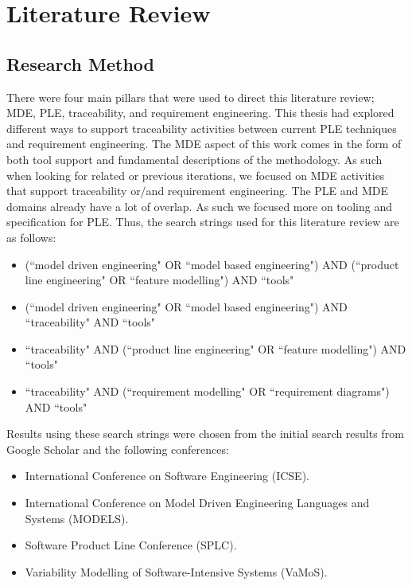 \chapter{Literature Review}
\label{chap:lit_rev}
\section{Research Method}
There were four main pillars that were used to direct this literature review; \ac{MDE}, \ac{PLE}, traceability, and requirement engineering. This thesis had explored different ways to support traceability activities between current \ac{PLE} techniques and requirement engineering. The \ac{MDE} aspect of this work comes in the form of both tool support and fundamental descriptions of the methodology. As such when looking for related or previous iterations, we focused on \ac{MDE} activities that support traceability or/and requirement engineering. The \ac{PLE} and \ac{MDE} domains already have a lot of overlap. As such we focused more on tooling and specification for \ac{PLE}. Thus, the search strings used for this literature review are as follows:
\begin{itemize}
	\item (``model driven engineering" OR ``model based engineering") AND (``product line engineering" OR ``feature modelling") AND ``tools"
	\item (``model driven engineering" OR ``model based engineering") AND ``traceability" AND ``tools"
	\item ``traceability" AND (``product line engineering" OR ``feature modelling") AND ``tools"
	\item ``traceability" AND (``requirement modelling" OR ``requirement diagrams") AND ``tools"
\end{itemize}

Results using these search strings were chosen from the initial search results from Google Scholar and the following conferences:
\begin{itemize}
	\item International Conference on Software Engineering (ICSE). 
	\item International Conference on Model Driven Engineering Languages and Systems (MODELS). 
	\item Software Product Line Conference (SPLC).
	\item Variability Modelling of Software-Intensive Systems (VaMoS).
\end{itemize}


